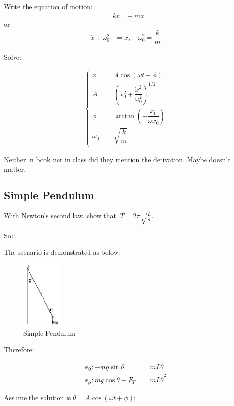 \documentclass[11pt, a4paper, oneside]{book}
\numberwithin{equation}{section}%
\begin{document}
Write the equation of motion:
\begin{align}
	-kx &= m\ddot{x}
\end{align}
or
\begin{align}
	\ddot{x} + \omega_0^2 &= x,\quad\omega_0^2 = \dfrac{k}{m}
\end{align}

Solve:

\begin{align}
	\left\{\begin{aligned}
	x &= A\cos(\omega t + \phi)\\
	A &= \left(x_0^2 + \dfrac{\dot{x}^2}{\omega_0^2}\right)^{1/2}\\
	\phi &= \arctan \left(-\dfrac{\dot{x}_0}{\omega x_0}\right)\\
	\omega_0 &= \sqrt{\dfrac{k}{m}}
	\end{aligned}\right.
\end{align}

Neither in book nor in class did they mention the derivation. Maybe doesn't matter. 

\subsection{Simple Pendulum}

With Newton's second law, show that: $ \displaystyle{T = 2\pi \sqrt{\frac{L}{g}}} $.

Sol:

The scenario is demonstrated as below:

\begin{figure}[H]
	\centering
	\includegraphics[width=2cm]{"Simple Pendulum"}
	\caption{Simple Pendulum}
	\label{simple-pendulum}
\end{figure}

Therefore:

\begin{align}
\bm{e_\theta}: -mg \sin\theta &= mL \ddot{\theta}\\
\bm{e_\rho}: mg\cos\theta - F_T &= mL\dot{\theta}^2
\end{align}

Assume the solution is $ \theta = A\cos(\omega t + \phi) $;
\end{document}
